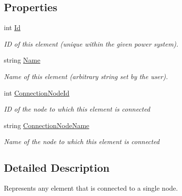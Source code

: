 \subsection*{Properties}
\begin{DoxyCompactItemize}
\item 
int \hyperlink{class_power_system_planning_1_1_node_element_aa18ee6e98501ec6c8c235058888a47e3}{Id}
\begin{DoxyCompactList}\small\item\em ID of this element (unique within the given power system). \end{DoxyCompactList}\item 
string \hyperlink{class_power_system_planning_1_1_node_element_a07a0b254e0ac3b4b97dd45bde0a44291}{Name}
\begin{DoxyCompactList}\small\item\em Name of this element (arbitrary string set by the user). \end{DoxyCompactList}\item 
int \hyperlink{class_power_system_planning_1_1_node_element_ad8330c198a514aa94bc329e89125796a}{Connection\+Node\+Id}
\begin{DoxyCompactList}\small\item\em ID of the node to which this element is connected \end{DoxyCompactList}\item 
string \hyperlink{class_power_system_planning_1_1_node_element_a0649bf960bef5b6e95ab990de84caa66}{Connection\+Node\+Name}
\begin{DoxyCompactList}\small\item\em Name of the node to which this element is connected \end{DoxyCompactList}\end{DoxyCompactItemize}


\subsection{Detailed Description}
Represents any element that is connected to a single node. 



